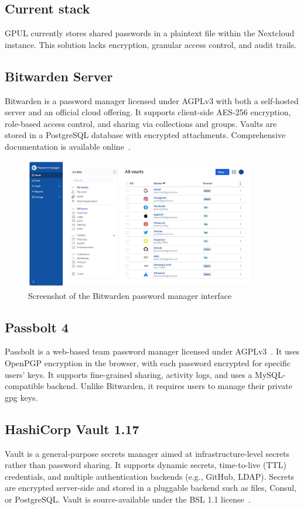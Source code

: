 \subsection*{Current stack}
GPUL currently stores shared passwords in a plaintext file within the Nextcloud instance. This solution lacks encryption, granular access control, and audit trails.

\subsection*{Bitwarden Server}
Bitwarden is a password manager licensed under AGPLv3 with both a self-hosted server and an official cloud offering. It supports client-side AES-256 encryption, role-based access control, and sharing via collections and groups. Vaults are stored in a PostgreSQL database with encrypted attachments. Comprehensive documentation is available online~\cite{bitwarden-docs}.

\begin{figure}[h!]
  \centering
  \includegraphics[width=0.9\textwidth]{imaxes/bitwarden-ui.png}
  \caption{Screenshot of the Bitwarden password manager interface}
  \label{fig:bitwarden-ui}
\end{figure}

\subsection*{Passbolt 4}
Passbolt is a web-based team password manager licensed under AGPLv3~\cite{passbolt-security}. It uses OpenPGP encryption in the browser, with each password encrypted for specific users' keys. It supports fine-grained sharing, activity logs, and uses a MySQL-compatible backend. Unlike Bitwarden, it requires users to manage their private \gls{gpg} keys.

\subsection*{HashiCorp Vault 1.17}
Vault is a general-purpose secrets manager aimed at infrastructure-level secrets rather than password sharing. It supports dynamic secrets, time-to-live (TTL) credentials, and multiple authentication backends (e.g., GitHub, LDAP). Secrets are encrypted server-side and stored in a pluggable backend such as files, Consul, or PostgreSQL. Vault is source-available under the BSL 1.1 license~\cite{vault-bsl}.

